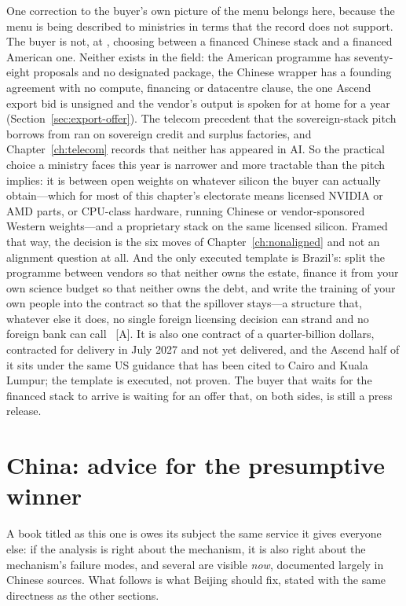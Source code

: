 One correction to the buyer's own picture of the menu belongs here, because the menu is being described to ministries in terms that the record does not support. The buyer is not, at \datafreeze, choosing between a financed Chinese stack and a financed American one. Neither exists in the field: the American programme has seventy-eight proposals and no designated package, the Chinese wrapper has a founding agreement with no compute, financing or datacentre clause, the one Ascend export bid is unsigned and the vendor's output is spoken for at home for a year (Section~\ref{sec:export-offer}). The telecom precedent that the sovereign-stack pitch borrows from ran on sovereign credit and surplus factories, and Chapter~\ref{ch:telecom} records that neither has appeared in AI. So the practical choice a ministry faces this year is narrower and more tractable than the pitch implies: it is between open weights on whatever silicon the buyer can actually obtain---which for most of this chapter's electorate means licensed NVIDIA or AMD parts, or CPU-class hardware, running Chinese or vendor-sponsored Western weights---and a proprietary stack on the same licensed silicon. Framed that way, the decision is the six moves of Chapter~\ref{ch:nonaligned} and not an alignment question at all. And the only executed template is Brazil's: split the programme between vendors so that neither owns the estate, finance it from your own science budget so that neither owns the debt, and write the training of your own people into the contract so that the spillover stays---a structure that, whatever else it does, no single foreign licensing decision can strand and no foreign bank can call~\cite{brazil-ai-supercomputer} [A]. It is also one contract of a quarter-billion dollars, contracted for delivery in July 2027 and not yet delivered, and the Ascend half of it sits under the same US guidance that has been cited to Cairo and Kuala Lumpur; the template is executed, not proven. The buyer that waits for the financed stack to arrive is waiting for an offer that, on both sides, is still a press release.

\section{China: advice for the presumptive winner}
\label{sec:china-advice}

A book titled as this one is owes its subject the same service it gives everyone else: if the analysis is right about the mechanism, it is also right about the mechanism's failure modes, and several are visible \emph{now}, documented largely in Chinese sources. What follows is what Beijing should fix, stated with the same directness as the other sections.

